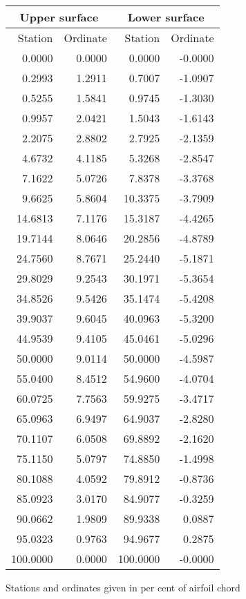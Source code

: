 \documentclass[11pt]{book}
\begin{document}
 \hspace{4mm}
 \begin{tabular}{|r|r|r|r|} \hline 
 \multicolumn{2}{|c|}{Upper surface} & \multicolumn{2}{|c|}{Lower surface} \\
 \hline
 Station & Ordinate & Station & Ordinate \\
 \hline
0.0000 & 0.0000 & 0.0000 & -0.0000 \\
0.2993 & 1.2911 & 0.7007 & -1.0907 \\
0.5255 & 1.5841 & 0.9745 & -1.3030 \\
0.9957 & 2.0421 & 1.5043 & -1.6143 \\
2.2075 & 2.8802 & 2.7925 & -2.1359 \\
4.6732 & 4.1185 & 5.3268 & -2.8547 \\
7.1622 & 5.0726 & 7.8378 & -3.3768 \\
9.6625 & 5.8604 & 10.3375 & -3.7909 \\
14.6813 & 7.1176 & 15.3187 & -4.4265 \\
19.7144 & 8.0646 & 20.2856 & -4.8789 \\
24.7560 & 8.7671 & 25.2440 & -5.1871 \\
29.8029 & 9.2543 & 30.1971 & -5.3654 \\
34.8526 & 9.5426 & 35.1474 & -5.4208 \\
39.9037 & 9.6045 & 40.0963 & -5.3200 \\
44.9539 & 9.4105 & 45.0461 & -5.0296 \\
50.0000 & 9.0114 & 50.0000 & -4.5987 \\
55.0400 & 8.4512 & 54.9600 & -4.0704 \\
60.0725 & 7.7563 & 59.9275 & -3.4717 \\
65.0963 & 6.9497 & 64.9037 & -2.8280 \\
70.1107 & 6.0508 & 69.8892 & -2.1620 \\
75.1150 & 5.0797 & 74.8850 & -1.4998 \\
80.1088 & 4.0592 & 79.8912 & -0.8736 \\
85.0923 & 3.0170 & 84.9077 & -0.3259 \\
90.0662 & 1.9809 & 89.9338 & 0.0887 \\
95.0323 & 0.9763 & 94.9677 & 0.2875 \\
100.0000 & 0.0000 & 100.0000 & -0.0000 \\
 \hline 
 \end{tabular}
 \vspace{8mm}

Stations and ordinates given in per cent of airfoil chord
\end{document}
